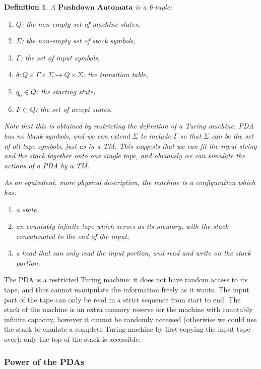 \documentclass[12pt]{article}  %
\newtheorem{definition}{Definition}
\begin{document}
\begin{definition}
A $\textbf{Pushdown Automata}$ is a 6-tuple:
\begin{enumerate}
	\item $Q$: the non-empty set of machine states,
	\item $\Sigma$: the non-empty set of stack symbols,
	\item $\Gamma$: the set of input symbols,
	\item $\delta: Q \times \Gamma \times \Sigma \mapsto Q \times \Sigma $: the transition table,
	\item $q_0 \in Q$: the starting state,
	\item $F \subset Q$: the set of accept states.
\end{enumerate}

Note that this is obtained by restricting the definition of a Turing machine. PDA has no blank symbols, and we can extend $\Sigma$ to include $\Gamma$ so that $\Sigma$ can be the set of all tape symbols, just as in a TM. This suggests that we can fit the input string and the stack together onto one single tape, and obviously we can simulate the actions of a PDA by a TM.

As an equivalent, more physical description, the machine is a configuration which has:
\begin{enumerate}
	\item a state,
	\item an countably infinite tape which serves as its memory, with the stack concatenated to the end of the input,
	\item a head that can only read the input portion, and read and write on the stack portion.
\end{enumerate}
\end{definition}



The PDA is a restricted Turing machine: it does not have random access to its tape, and thus cannot manipulate the information freely as it wants. The input part of the tape can only be read in a strict sequence from start to end. The stack of the machine is an extra memory reserve for the machine with countably infinite capacity, however it cannot be randomly accessed (otherwise we could use the stack to emulate a complete Turing machine by first copying the input tape over); only the top of the stack is accessible.




\subsubsection{Power of the PDAs}
\end{document}
